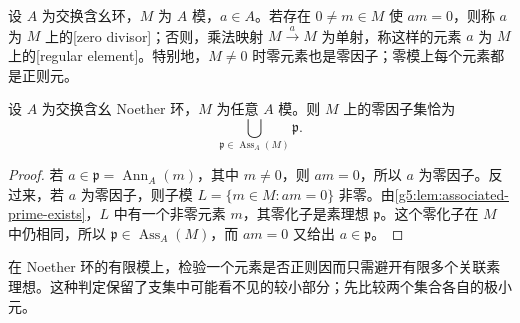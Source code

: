 \begin{definition}\label{g5:def:module-zero-divisor}
	设 \(A\) 为交换含幺环，\(M\) 为 \(A\) 模，\(a\in A\)。若存在 \(0\ne m\in M\) 使 \(am=0\)，则称 \(a\) 为 \(M\) 上的[zero divisor]；否则，乘法映射 \(M\xrightarrow{a}M\) 为单射，称这样的元素 \(a\) 为 \(M\) 上的[regular element]。特别地，\(M\ne0\) 时零元素也是零因子；零模上每个元素都是正则元。
\end{definition}

\begin{theorem}\label{g5:thm:zero-divisors-associated}
	设 \(A\) 为交换含幺 Noether 环，\(M\) 为任意 \(A\) 模。则 \(M\) 上的零因子集恰为
	\[
		\bigcup_{\mathfrak p\in\operatorname{Ass}_A(M)}\mathfrak p.
	\]
\end{theorem}
\begin{proof}
	若 \(a\in\mathfrak p=\operatorname{Ann}_A(m)\)，其中 \(m\ne0\)，则 \(am=0\)，所以 \(a\) 为零因子。反过来，若 \(a\) 为零因子，则子模 \(L=\{m\in M:am=0\}\) 非零。由\cref{g5:lem:associated-prime-exists}，\(L\) 中有一个非零元素 \(m\)，其零化子是素理想 \(\mathfrak p\)。这个零化子在 \(M\) 中仍相同，所以 \(\mathfrak p\in\operatorname{Ass}_A(M)\)，而 \(am=0\) 又给出 \(a\in\mathfrak p\)。
\end{proof}

在 Noether 环的有限模上，检验一个元素是否正则因而只需避开有限多个关联素理想。这种判定保留了支集中可能看不见的较小部分；先比较两个集合各自的极小元。

